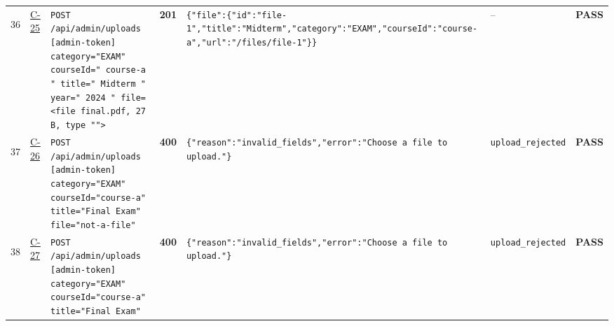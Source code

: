 \documentclass[10pt,a4paper]{article}
\begin{document}
\begin{landscape}
\begin{longtable}{@{}P{0.6cm}P{0.9cm}P{8.5cm}P{1.0cm}P{6.2cm}P{4.2cm}P{1.1cm}@{}}
\hypertarget{call36}{36} & \hyperlink{test-C-25}{C-25} & \texttt{POST /\allowbreak{}api/\allowbreak{}admin/\allowbreak{}uploads [admin-\allowbreak{}token] category=\allowbreak{}"\allowbreak{}EXAM"\allowbreak{} courseId=\allowbreak{}"\allowbreak{} course-\allowbreak{}a "\allowbreak{} title=\allowbreak{}"\allowbreak{}  Midterm  "\allowbreak{} year=\allowbreak{}"\allowbreak{} 2024 "\allowbreak{} file=\allowbreak{}<file final.\allowbreak{}pdf,\allowbreak{} 27 B,\allowbreak{} type "\allowbreak{}"\allowbreak{}>} & \textcolor{passgreen}{\textbf{201}} & \texttt{\{"\allowbreak{}file"\allowbreak{}:\allowbreak{}\{"\allowbreak{}id"\allowbreak{}:\allowbreak{}"\allowbreak{}file-\allowbreak{}1"\allowbreak{},\allowbreak{}"\allowbreak{}title"\allowbreak{}:\allowbreak{}"\allowbreak{}Midterm"\allowbreak{},\allowbreak{}"\allowbreak{}category"\allowbreak{}:\allowbreak{}"\allowbreak{}EXAM"\allowbreak{},\allowbreak{}"\allowbreak{}courseId"\allowbreak{}:\allowbreak{}"\allowbreak{}course-\allowbreak{}a"\allowbreak{},\allowbreak{}"\allowbreak{}url"\allowbreak{}:\allowbreak{}"\allowbreak{}/\allowbreak{}files/\allowbreak{}file-\allowbreak{}1"\allowbreak{}\}\}} & -- & \textcolor{passgreen}{\textbf{PASS}} \\
\hypertarget{call37}{37} & \hyperlink{test-C-26}{C-26} & \texttt{POST /\allowbreak{}api/\allowbreak{}admin/\allowbreak{}uploads [admin-\allowbreak{}token] category=\allowbreak{}"\allowbreak{}EXAM"\allowbreak{} courseId=\allowbreak{}"\allowbreak{}course-\allowbreak{}a"\allowbreak{} title=\allowbreak{}"\allowbreak{}Final Exam"\allowbreak{} file=\allowbreak{}"\allowbreak{}not-\allowbreak{}a-\allowbreak{}file"\allowbreak{}} & \textcolor{warnamber}{\textbf{400}} & \texttt{\{"\allowbreak{}reason"\allowbreak{}:\allowbreak{}"\allowbreak{}invalid\_\allowbreak{}fields"\allowbreak{},\allowbreak{}"\allowbreak{}error"\allowbreak{}:\allowbreak{}"\allowbreak{}Choose a file to upload.\allowbreak{}"\allowbreak{}\}} & \texttt{upload\_\allowbreak{}rejected} & \textcolor{passgreen}{\textbf{PASS}} \\
\hypertarget{call38}{38} & \hyperlink{test-C-27}{C-27} & \texttt{POST /\allowbreak{}api/\allowbreak{}admin/\allowbreak{}uploads [admin-\allowbreak{}token] category=\allowbreak{}"\allowbreak{}EXAM"\allowbreak{} courseId=\allowbreak{}"\allowbreak{}course-\allowbreak{}a"\allowbreak{} title=\allowbreak{}"\allowbreak{}Final Exam"\allowbreak{}} & \textcolor{warnamber}{\textbf{400}} & \texttt{\{"\allowbreak{}reason"\allowbreak{}:\allowbreak{}"\allowbreak{}invalid\_\allowbreak{}fields"\allowbreak{},\allowbreak{}"\allowbreak{}error"\allowbreak{}:\allowbreak{}"\allowbreak{}Choose a file to upload.\allowbreak{}"\allowbreak{}\}} & \texttt{upload\_\allowbreak{}rejected} & \textcolor{passgreen}{\textbf{PASS}} \\

\end{longtable}
\end{landscape}
\end{document}
